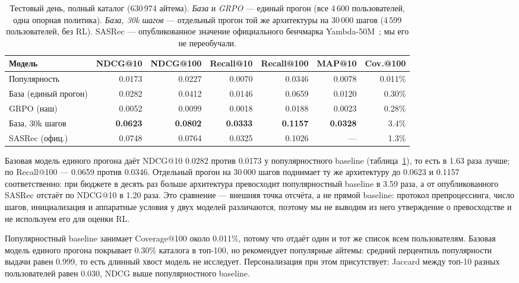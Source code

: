 \begin{table}[t]
\centering
\caption{Тестовый день, полный каталог (630\,974 айтема). \emph{База} и
\emph{GRPO} --- единый прогон (все 4\,600 пользователей, одна опорная
политика). \emph{База, 30k шагов} --- отдельный прогон той же архитектуры
на 30\,000 шагов (4\,599 пользователей, без RL). SASRec ---
опубликованное значение официального бенчмарка Yambda-50M~\cite{sasrec};
мы его не переобучали.}
\label{tab:test}
\small
\begin{tabular}{@{}lrrrrrr@{}}
\toprule
Модель & NDCG@10 & NDCG@100 & Recall@10 & Recall@100 & MAP@10 & Cov.@100 \\
\midrule
Популярность      & 0.0173 & 0.0227 & 0.0070 & 0.0346 & 0.0078 & 0.011\% \\
База (единый прогон) & 0.0282 & 0.0412 & 0.0146 & 0.0659 & 0.0120 & 0.30\% \\
GRPO (наш)        & 0.0052 & 0.0099 & 0.0018 & 0.0188 & 0.0023 & 0.28\% \\
\midrule
База, 30k шагов   & \textbf{0.0623} & \textbf{0.0802} & \textbf{0.0333} & \textbf{0.1157} & \textbf{0.0328} & 3.4\% \\
SASRec (офиц.)    & 0.0748 & 0.0764 & 0.0325 & 0.1026 & --- & 1.3\% \\
\bottomrule
\end{tabular}
\end{table}

Базовая модель единого прогона даёт NDCG@10 0.0282 против 0.0173 у
популярностного baseline (таблица~\ref{tab:test}), то есть в 1.63 раза
лучше; по Recall@100 --- 0.0659 против 0.0346. Отдельный прогон на 30\,000
шагов поднимает ту же архитектуру до 0.0623 и 0.1157 соответственно: при
бюджете в десять раз больше архитектура превосходит популярностный baseline
в 3.59 раза, а от опубликованного SASRec отстаёт по NDCG@10 в 1.20 раза. Это сравнение --- внешняя точка отсчёта, а не прямой baseline:
протокол препроцессинга, число шагов, инициализация и аппаратные условия у
двух моделей различаются, поэтому мы не выводим из него утверждение о
превосходстве и не используем его для оценки RL.

Популярностный baseline занимает Coverage@100 около 0.011\%, потому что
отдаёт один и тот же список всем пользователям. Базовая модель единого
прогона покрывает 0.30\% каталога в топ-100, но рекомендует популярные
айтемы: средний перцентиль популярности выдачи равен 0.999, то есть длинный
хвост модель не исследует. Персонализация при этом присутствует: Jaccard
между топ-10 разных пользователей равен 0.030, NDCG выше популярностного
baseline.



